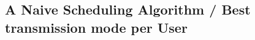 \subsection{A Naive Scheduling Algorithm / Best transmission mode per User}
\label{subsec:naive_scheduling}



